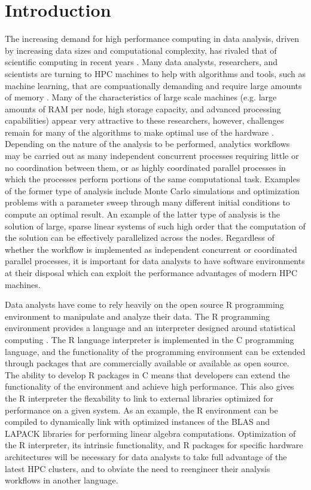 \graphicspath{{plots/}}
\section{Introduction}
The increasing demand for high performance computing in data analysis, driven by
increasing data sizes and computational complexity, has rivaled that of scientific
computing in recent years \cite{fox:bdBenchmarking, kouzes:paradigm}. Many data analysts,
researchers, and scientists are turning to HPC machines to help with algorithms and tools,
such as machine learning, that are compuationally demanding and require large amounts of
memory \cite{raj:hpcBigData}. Many of the characteristics of large scale machines (e.g.
large amounts of RAM per node, high storage capacity, and advanced processing
capabilities) appear very attractive to these researchers, however, challenges remain for
many of the algorithms to make optimal use of the hardware \cite{lee:model}. Depending on
the nature of the analysis to be performed, analytics workflows may be carried out as many
independent concurrent processes requiring little or no coordination between them, or as
highly coordinated parallel processes in which the processes perform portions of the same
computational task. Examples of the former type of analysis include Monte Carlo
simulations and optimization problems with a parameter sweep through many different
initial conditions to compute an optimal result.  An example of the latter type of
analysis is the solution of large, sparse linear systems of such high order that the
computation of the solution can be effectively parallelized across the nodes. Regardless
of whether the workflow is implemented as independent concurrent or coordinated parallel
processes, it is important for data analysts to have software environments at their
disposal which can exploit the performance advantages of modern HPC machines.

Data analysts have come to rely heavily on the open source R programming environment to
manipulate and analyze their data. The R programming environment provides a language and
an interpreter designed around statistical computing \cite{ihaka:R}. The R language
interpreter is implemented in the C programming language, and the functionality of the
programming environment can be extended through packages that are commercially available
or available as open source. The ability to develop R packages in C means that developers
can extend the functionality of the environment and achieve high performance. This also
gives the R interpreter the flexability to link to external libraries optimized for
performance on a given system. As an example, the R environment can be compiled to
dynamically link with optimized instances of the BLAS \cite{dongarra:1990blas} and LAPACK
\cite{hammarling:1988blas} libraries for performing linear algebra computations.
Optimization of the R interpreter, its intrinsic functionality, and R packages for
specific hardware architectures will be necessary for data analysts to take full advantage
of the latest HPC clusters, and to obviate the need to reengineer their analysis workflows
in another language.

